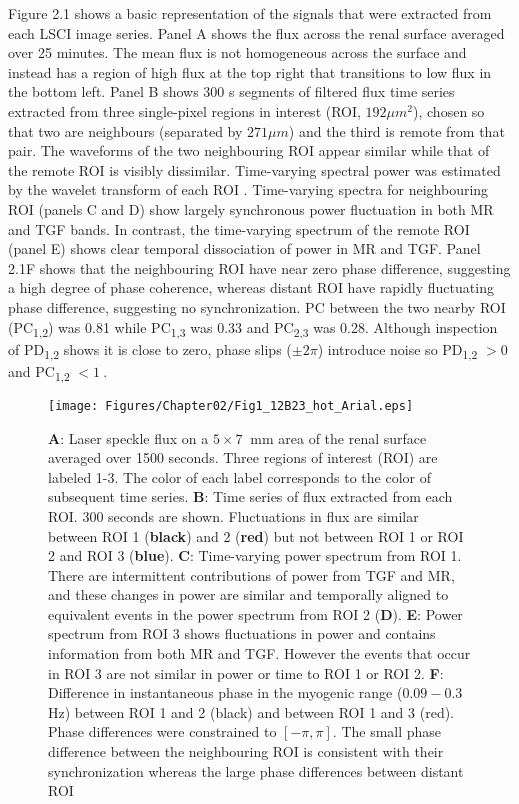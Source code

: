 	Figure 2.1 shows a basic representation of the signals that were extracted from each LSCI image series. Panel A shows the flux across the renal surface averaged over 25 minutes. The mean flux is not homogeneous across the surface and instead has a region of high flux at the top right that transitions to low flux in the bottom left. Panel B shows 300 s segments of filtered flux time series extracted from three single-pixel regions in interest (ROI, $192 \mu m^2$), chosen so that two are neighbours (separated by $271 \mu m$) and the third is remote from that pair. The waveforms of the two neighbouring ROI appear similar while that of the remote ROI is visibly dissimilar. Time-varying spectral power was estimated by the wavelet transform of each ROI \cite{Scully13}. Time-varying spectra for neighbouring ROI (panels C and D) show largely synchronous power fluctuation in both MR and TGF bands. In contrast, the time-varying spectrum of the remote ROI (panel E) shows clear temporal dissociation of power in MR and TGF. Panel 2.1F shows that the neighbouring ROI have near zero phase difference, suggesting a high degree of phase coherence, whereas distant ROI have rapidly fluctuating phase difference, suggesting no synchronization. PC between the two nearby ROI (PC\textsubscript{1,2}) was 0.81 while PC\textsubscript{1,3} was 0.33 and PC\textsubscript{2,3} was 0.28. Although inspection of PD\textsubscript{1,2} shows it is close to zero, phase slips ($\pm 2\pi$) introduce noise so PD\textsubscript{1,2} $> 0\ $ and PC\textsubscript{1,2} $< 1\ $. 
	
\begin{figure}[H]
\begin{center}
\texttt{[image: Figures/Chapter02/Fig1\_12B23\_hot\_Arial.eps]}
\caption[Summary of cortical perfusion dynamics]{\textbf{A}: Laser speckle flux on a $5\times 7 \ $ mm area of the renal surface averaged over 1500 seconds. Three regions of interest (ROI) are labeled 1-3. The color of each label corresponds to the color of subsequent time series. \textbf{B}: Time series of flux extracted from each ROI. 300 seconds are shown. Fluctuations in flux are similar between ROI 1 (\textbf{black}) and 2 (\textbf{red}) but not between ROI 1 or ROI 2 and ROI 3 (\textbf{blue}). \textbf{C}: Time-varying power spectrum from ROI 1. There are intermittent contributions of power from TGF and MR, and these changes in power are similar and temporally aligned to equivalent events in the power spectrum from ROI 2 (\textbf{D}). \textbf{E}: Power spectrum from ROI 3 shows fluctuations in power and contains information from both MR and TGF. However the events that occur in ROI 3 are not similar in power or time to ROI 1 or ROI 2. \textbf{F}: Difference in instantaneous phase in the myogenic range ($0.09 - 0.3 \ $ Hz) between ROI 1 and 2 (black) and between ROI 1 and 3 (red). Phase differences were constrained to $[-\pi , \pi]$. The small phase difference between the neighbouring ROI is consistent with their synchronization whereas the large phase differences between distant ROI}
\end{center}
\end{figure}

